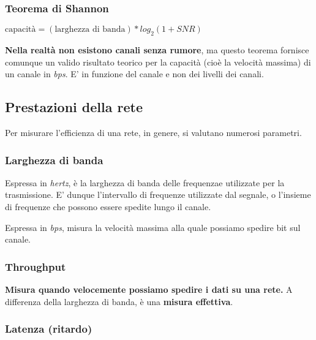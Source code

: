         \subsubsection{Teorema di Shannon}
        
            \(\text{capacità}=(\text{larghezza di banda})*log_2 (1+SNR)\)
            
            \vspace{3mm}
            
            \textbf{Nella realtà non esistono canali senza rumore}, ma questo teorema fornisce comunque un valido risultato teorico per la capacità (cioè la velocità massima) di un canale in \textit{bps}. E' in funzione del canale e non dei livelli dei canali.
            
    \subsection{Prestazioni della rete}    
        
        Per misurare l'efficienza di una rete, in genere, si valutano numerosi parametri.
        
        \subsubsection{Larghezza di banda}
        
            Espressa in \textit{hertz}, è la larghezza di banda delle frequenzae utilizzate per la trasmissione. E' dunque l'intervallo di frequenze utilizzate dal segnale, o l'insieme di frequenze che possono essere spedite lungo il canale.
            
            Espressa in \textit{bps}, misura la velocità massima alla quale possiamo spedire bit sul canale.
            
        \subsubsection{Throughput}
        
            \textbf{Misura quando velocemente possiamo spedire i dati su una rete.} A differenza della larghezza di banda, è una \textbf{misura effettiva}.
            
        \subsubsection{Latenza (ritardo)}
        
